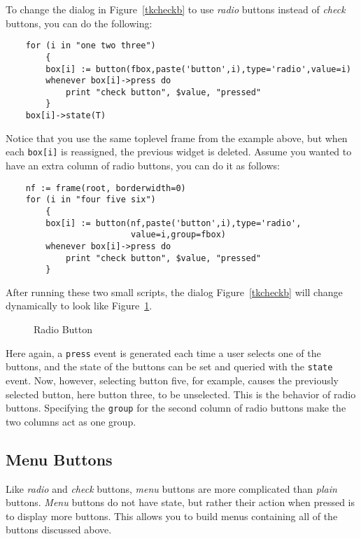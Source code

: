 To change the dialog in Figure~\ref{tkcheckb} to use {\em radio} buttons instead
of {\em check} buttons, you can do the following:
\begin{verbatim}
    for (i in "one two three")
        {
        box[i] := button(fbox,paste('button',i),type='radio',value=i)
        whenever box[i]->press do
            print "check button", $value, "pressed"
        }
    box[i]->state(T)
\end{verbatim}
Notice that you use the same toplevel frame from the example above, but
when each \verb+box[i]+ is reassigned, the previous widget is deleted.
Assume you wanted to have an extra column of radio buttons, you can do
it as follows:
\begin{verbatim}
    nf := frame(root, borderwidth=0)
    for (i in "four five six")
        {
        box[i] := button(nf,paste('button',i),type='radio',
                         value=i,group=fbox)
        whenever box[i]->press do
            print "check button", $value, "pressed"
        }
\end{verbatim}
After running these two small scripts, the dialog Figure~\ref{tkcheckb} will
change dynamically to look like Figure~\ref{tkradiob}.
\begin{figure}[thb]
\centerline{}
\caption{ Radio Button }
\label{tkradiob}
\end{figure}
Here again, a {\tt press} event is generated each time a user selects one of the
buttons, and the state of the buttons can be set and queried with the {\tt state}
event. Now, however, selecting button five, for example, causes the previously
selected button, here button three, to be unselected. This is the behavior of
radio buttons. Specifying the {\tt group} for the second column of radio buttons
make the two columns act as one group.

\subsection{Menu Buttons}
Like {\em radio} and {\em check} buttons, {\em menu} buttons are more complicated
than {\em plain} buttons. {\em Menu} buttons do not have state, but rather their
action when pressed is to display more buttons. This allows you to build
menus containing all of the buttons discussed above.

